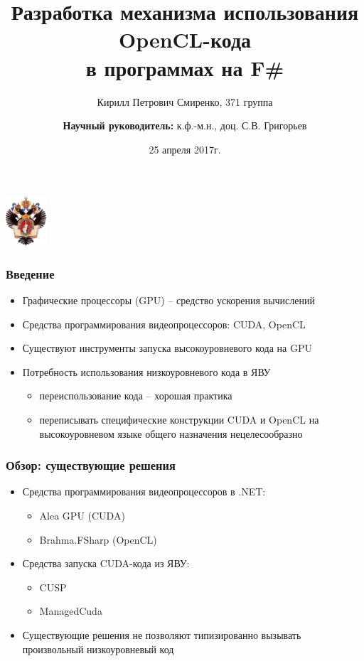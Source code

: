\documentclass{beamer}
\title[]{Разработка механизма использования OpenCL-кода \\
в программах на F\#}
\institute[СПбГУ]{
Санкт-Петербургский государственный университет \\
Кафедра системного программирования }
\author[Кирилл Смиренко]{Кирилл Петрович Смиренко, 371 группа \\
  \and
    {\bfseries Научный руководитель:} к.ф.-м.н., доц. С.В. Григорьев}
\date{25 апреля 2017г.}
\begin{document}
{
\begin{frame}
  \begin{center}
  {\includegraphics[width=1.5cm]{pictures/SPbGU_Logo.png}}
  \end{center}
  \titlepage
\end{frame}
}

\begin{frame}[fragile]
  \transwipe[direction=90]
  \frametitle{Введение}
  \begin{itemize}
    \item Графические процессоры (GPU) – средство ускорения вычислений
    \item Средства программирования видеопроцессоров: CUDA, OpenCL
    \item Существуют инструменты запуска высокоуровневого кода на GPU
  \end{itemize}
  \begin{itemize}
    \item Потребность использования низкоуровневого кода в ЯВУ
    \begin{itemize}
      \item переиспользование кода – хорошая практика
      \item переписывать специфические конструкции CUDA и OpenCL на высокоуровневом языке общего назначения нецелесообразно
    \end{itemize}
  \end{itemize}
\end{frame}

\begin{frame}
  \transwipe[direction=90]
  \frametitle{Обзор: существующие решения}
  \begin{itemize}
      \item Средства программирования видеопроцессоров в .NET:
      \begin{itemize}
        \item Alea GPU (CUDA)
        \item Brahma.FSharp (OpenCL)
      \end{itemize}
  \end{itemize}

  \begin{itemize}
    \item Средства запуска CUDA-кода из ЯВУ:
    \begin{itemize}
      \item CUSP
      \item ManagedCuda
    \end{itemize}
  \end{itemize}

  \begin{itemize}
    \item Существующие решения не позволяют типизированно вызывать произвольный низкоуровневый код
  \end{itemize}
\end{frame}
\end{document}
